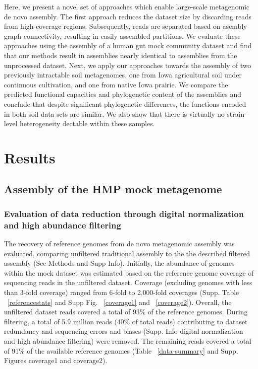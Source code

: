 \documentclass[11pt]{article} %
\begin{document}
Here, we present a novel set of approaches which enable large-scale metagenomic de novo assembly.  The first approach reduces the dataset size by discarding reads from high-coverage regions.  Subsequently, reads are separated based on asembly graph connectivity, resulting in easily assembled partitions.   We evaluate these approaches using the assembly of a human gut mock community dataset and find that our methods result in assemblies nearly identical to assemblies from the unprocessed dataset.  Next, we apply our approaches towards the assembly of two previously intractable soil metagenomes, one from Iowa agricultural soil under continuous cultivation, and one from native Iowa prairie.  We compare the predicted functional capacities and phylogenetic content of the assemblies and conclude that despite significant phylogenetic differences, the functions encoded in both soil data sets are similar.  We also show that there is virtually no strain-level heterogeneity dectable within these samples.

\section{Results}

\subsection{Assembly of the HMP mock metagenome}

\subsubsection{Evaluation of data reduction through digital normalization and high abundance filtering}

The recovery of reference genomes from de novo metagenomic assembly was evaluated, comparing unfiltered traditional assembly to the the described filtered assembly (See Methods and Supp Info). Initially, the abundance of genomes within the mock dataset was estimated based on the reference genome coverage of sequencing reads in the unfiltered dataset.  Coverage (excluding genomes with less than 3-fold coverage) ranged from 6-fold to 2,000-fold coverages (Supp. Table ~\ref{referencestats} and Supp Fig. ~\ref{coverage1} and ~\ref{coverage2}).  Overall, the unfiltered dataset reads covered a total of 93\% of the reference genomes.  During filtering, a total of 5.9 million reads (40\% of total reads) contributing to dataset redundancy and sequencing errors and biases (Supp. Info digital normalization and high abundance filtering) were removed.  The remaining reads covered a total of 91\% of the available reference genomes (Table ~\ref{data-summary} and Supp. Figures coverage1 and coverage2).   
\end{document}
